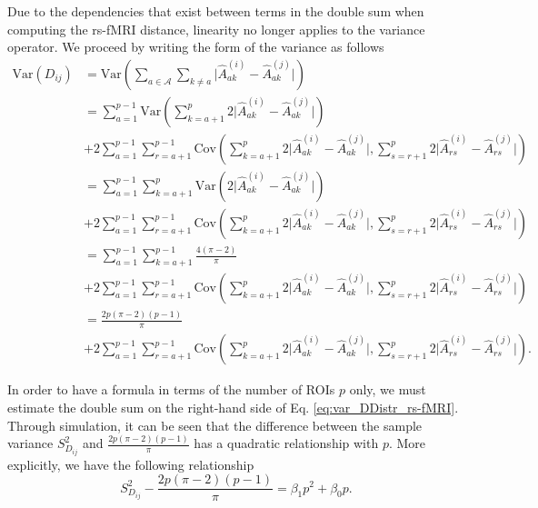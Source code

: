 \documentclass[10pt,letterpaper]{article}\usepackage[]{graphicx}\usepackage[]{color}
\begin{document}
Due to the dependencies that exist between terms in the double sum when computing the rs-fMRI distance, linearity no longer applies to the variance operator. We proceed by writing the form of the variance as follows
%
\begin{equation}\label{eq:var_DDistr_rs-fMRI}
\begin{aligned}
\text{Var}(D_{ij}) &= \text{Var}\left(\sum_{a \in \mathcal{A}} \sum_{k \neq a} \bigl|\hat{A}^{(i)}_{ak} - \hat{A}^{(j)}_{ak}\bigr|\right) \\
&= \sum_{a = 1}^{p-1} \text{Var}\left(\sum_{k=a+1}^{p} 2\bigl|\hat{A}^{(i)}_{ak} - \hat{A}^{(j)}_{ak}\bigr|\right) \\
&+ 2\sum_{a = 1}^{p-1} \sum_{r=a+1}^{p-1} \text{Cov}\left(\sum_{k=a+1}^{p} 2\bigl|\hat{A}^{(i)}_{ak} - \hat{A}^{(j)}_{ak}\bigr|, \sum_{s=r+1}^{p} 2\bigl|\hat{A}^{(i)}_{rs} - \hat{A}^{(j)}_{rs}\bigr|\right) \\
&= \sum_{a=1}^{p-1} \sum_{k=a+1}^{p} \text{Var}\left(2\bigl|\hat{A}^{(i)}_{ak} - \hat{A}^{(j)}_{ak}\bigr|\right) \\
&+ 2\sum_{a = 1}^{p-1} \sum_{r=a+1}^{p-1} \text{Cov}\left(\sum_{k=a+1}^{p} 2\bigl|\hat{A}^{(i)}_{ak} - \hat{A}^{(j)}_{ak}\bigr|, \sum_{s=r+1}^{p} 2\bigl|\hat{A}^{(i)}_{rs} - \hat{A}^{(j)}_{rs}\bigr|\right) \\
&= \sum_{a = 1}^{p-1} \sum_{k=a+1}^{p-1}\frac{4(\pi-2)}{\pi} \\
&+ 2\sum_{a = 1}^{p-1} \sum_{r=a+1}^{p-1} \text{Cov}\left(\sum_{k=a+1}^{p} 2\bigl|\hat{A}^{(i)}_{ak} - \hat{A}^{(j)}_{ak}\bigr|, \sum_{s=r+1}^{p} 2\bigl|\hat{A}^{(i)}_{rs} - \hat{A}^{(j)}_{rs}\bigr|\right) \\
&= \frac{2p(\pi-2)(p-1)}{\pi} \\
&+ 2\sum_{a = 1}^{p-1} \sum_{r=a+1}^{p-1} \text{Cov}\left(\sum_{k=a+1}^{p} 2\bigl|\hat{A}^{(i)}_{ak} - \hat{A}^{(j)}_{ak}\bigr|, \sum_{s=r+1}^{p} 2\bigl|\hat{A}^{(i)}_{rs} - \hat{A}^{(j)}_{rs}\bigr|\right).
\end{aligned}
\end{equation}

In order to have a formula in terms of the number of ROIs $p$ only, we must estimate the double sum on the right-hand side of Eq. \ref{eq:var_DDistr_rs-fMRI}. Through simulation, it can be seen that the difference between the sample variance $S^2_{D_{ij}}$ and $\frac{2p(\pi-2)(p-1)}{\pi}$ has a quadratic relationship with $p$. More explicitly, we have the following relationship
%
\begin{equation}\label{eq:estimate_cov}
S^2_{D_{ij}} - \frac{2p(\pi-2)(p-1)}{\pi} = \beta_1 p^2 + \beta_0 p.
\end{equation}
\end{document}
